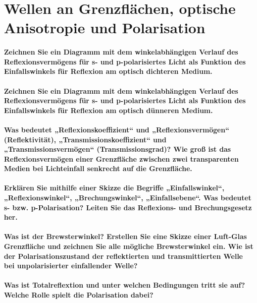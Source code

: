 \documentclass[a4paper, 11pt, parskip=half]{scrartcl}
\begin{document}
\newpage

\section{Wellen an Grenzflächen, optische Anisotropie und Polarisation}

\paragraph{Zeichnen Sie ein Diagramm mit dem winkelabhängigen Verlauf des Reflexionsvermögens für s-
und p-polarisiertes Licht als Funktion des Einfallswinkels für Reflexion am optisch dichteren
Medium.}

\paragraph{Zeichnen Sie ein Diagramm mit dem winkelabhängigen Verlauf des Reflexionsvermögens für s-
und p-polarisiertes Licht als Funktion des Einfallswinkels für Reflexion am optisch dünneren
Medium.}

\paragraph{Was bedeutet „Reflexionskoeffizient“ und „Reflexionsvermögen“ (Reflektivität),
„Transmissionskoeffizient“ und „Transmissionsvermögen“ (Transmissionsgrad)? Wie groß ist das
Reflexionsvermögen einer Grenzfläche zwischen zwei transparenten Medien bei Lichteinfall senkrecht
auf die Grenzfläche.}

\paragraph{Erklären Sie mithilfe einer Skizze die Begriffe „Einfallswinkel“, „Reflexionswinkel“, „Brechungswinkel“, „Einfallsebene“. Was bedeutet s- bzw. p-Polarisation? Leiten Sie das Reflexions-
und Brechungsgesetz her.}

\paragraph{Was ist der Brewsterwinkel? Erstellen Sie eine Skizze einer Luft-Glas Grenzfläche und
zeichnen Sie alle mögliche Brewsterwinkel ein. Wie ist der Polarisationszustand der reflektierten
und transmittierten Welle bei unpolarisierter einfallender Welle?}

\paragraph{Was ist Totalreflextion und unter welchen Bedingungen tritt sie auf? Welche Rolle spielt
die Polarisation dabei?}
\end{document}
